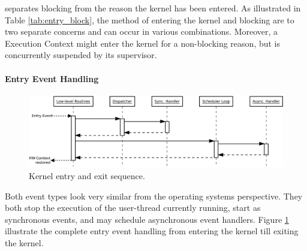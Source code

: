 \mythos separates blocking from the reason the kernel has been entered.
As illustrated in Table \ref{tab:entry_block}, the method of entering the kernel and blocking are to two separate concerns and can occur in various combinations.
Moreover, a Execution Context might enter the kernel for a non-blocking reason, but is concurrently suspended by its supervisor.

\paragraph{Entry Event Handling}

\begin{figure}
\begin{center}
\includegraphics[scale=0.25]{fig/entry.pdf}
\caption{Kernel entry and exit sequence.}
\label{fig:kernel-entry}
\end{center}
\end{figure}

Both event types look very similar from the operating systems perspective. They both stop the execution of the user-thread currently running, start as synchronous events, and may schedule asynchronous event handlers. Figure \ref{fig:kernel-entry} illustrate the complete entry event handling from entering the kernel till exiting the kernel.


